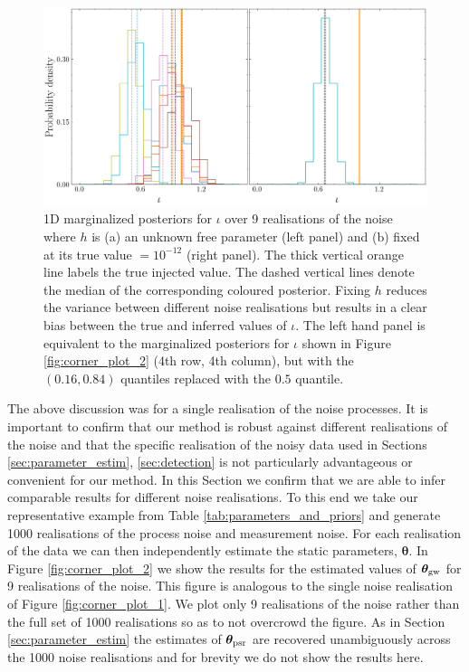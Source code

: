 \documentclass[fleqn,usenatbib,useAMS]{mnras}
\begin{document}
\begin{figure}
	\centering
	\includegraphics[width=\textwidth]{images/compare_iotas_lines2}
	\caption{1D marginalized posteriors for $\iota$ over 9 realisations of the noise where $h$ is (a) an unknown free parameter (left panel) and (b) fixed at its true value $= 10^{-12}$ (right panel). The thick vertical orange line labels the true injected value. The dashed vertical lines denote the median of the corresponding coloured posterior. Fixing $h$ reduces the variance between different noise realisations but results in a clear bias between the true and inferred values of $\iota$. The left hand panel is equivalent to the marginalized posteriors for $\iota$ shown in Figure \ref{fig:corner_plot_2} (4th row, 4th column), but with the $(0.16,0.84)$ quantiles replaced with the $0.5$ quantile.}
	\label{fig:iota}
\end{figure}
The above discussion was for a single realisation of the noise processes. It is important to confirm that our method is robust against different realisations of the noise and that the specific realisation of the noisy data used in Sections \ref{sec:parameter_estim}, \ref{sec:detection} is not particularly advantageous or convenient for our method. In this Section we confirm that we are able to infer comparable results for different noise realisations. To this end we take our representative example from Table \ref{tab:parameters_and_priors} and generate 1000 realisations of the process noise and measurement noise. For each realisation of the data we can then independently estimate the static parameters, $\boldsymbol{\theta}$. In Figure \ref{fig:corner_plot_2} we show the results for the  estimated values of $\boldsymbol{\theta}_{\rm gw}$ for 9 realisations of the noise. This figure is analogous to the single noise realisation of Figure \ref{fig:corner_plot_1}. We plot only 9 realisations of the noise rather than the full set of 1000 realisations so as to not overcrowd the figure. As in Section \ref{sec:parameter_estim} the estimates of $\boldsymbol{\theta}_{\rm psr}$ are recovered unambiguously across the 1000 noise realisations and for brevity we do not show the results here. \newline 
\end{document}
